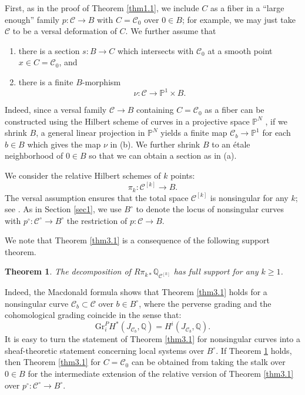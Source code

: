 \documentclass{pspum-l}
\theoremstyle{plain}
\newtheorem{thm}{Theorem}[section]
\theoremstyle{definition}
\theoremstyle{remark}
\newcommand{\BP}{{\mathbb{P}}}
\newcommand{\BQ}{{\mathbb{Q}}}
\newcommand{\CC}{{\mathcal C}}
\begin{document}
First, as in the proof of Theorem \ref{thm1.1}, we include $C$ as a fiber in a ``large enough'' family $p: \CC\to B$ with $C = \CC_0$ over $0 \in B$; for example, we may just take $\CC$ to be a versal deformation of $C$. We further assume that
\begin{enumerate}
    \item[(a)]  there is a section $s: B \rightarrow C$ which intersects with $\CC_0$ at a smooth point $x \in C = \CC_0$, and
    \item[(b)] there is a finite $B$-morphism
    \[
    \nu: \CC \to \mathbb{P}^1 \times B.
    \]
\end{enumerate} 
Indeed, since a versal family $\CC \to B$ containing $C =\CC_0$ as a fiber can be constructed using the Hilbert scheme of curves in a projective space $\BP^N$ \cite[Proposition 3.5]{MY}, if we shrink $B$, a general linear projection in $\BP^N$ yields a finite map $\CC_b \to \BP^1$ for each $b\in B$ which gives the map $\nu$ in (b). We further shrink $B$ to an \'etale neighborhood of $0\in B$ so that we can obtain a section as in (a).



We consider the relative Hilbert schemes of $k$ points:
\[
\pi_k: \CC^{[k]} \to B.
\]
The versal assumption ensures that the total space $\CC^{[k]}$ is nonsingular for any $k$; see \cite[Proposition 3.5]{MY}. As in Section \ref{sec1}, we use $B^\circ$ to denote the locus of nonsingular curves with $p^\circ: \CC^\circ \to B^\circ$ the restriction of $p: \CC \to B$.

We note that Theorem \ref{thm3.1} is a consequence of the following support theorem.

\begin{thm}\label{thm3.2}
    The decomposition of $R\pi_{k*} \BQ_{\CC^{[k]}}$ has full support for any $k\geq 1$.
\end{thm}

Indeed, the Macdonald formula shows that Theorem \ref{thm3.1} holds for a nonsingular curve $\CC_b \subset \CC$ over $b \in B^\circ$, where the perverse grading and the cohomological grading coincide in the sense that:
\[
\mathrm{Gr}^P_i H^*(J_{\CC_b}, \BQ) = H^i(J_{\CC_b}, \BQ).
\]
It is easy to turn the statement of Theorem \ref{thm3.1} for nonsingular curves into a sheaf-theoretic statement concerning local systems over $B^\circ$. If Theorem \ref{thm3.2} holds, then Theorem \ref{thm3.1} for $C = \CC_0$ can be obtained from taking the stalk over $0\in B$ for the intermediate extension of the relative version of Theorem \ref{thm3.1} over $p^\circ: \CC^\circ \to B^\circ$.
\end{document}
